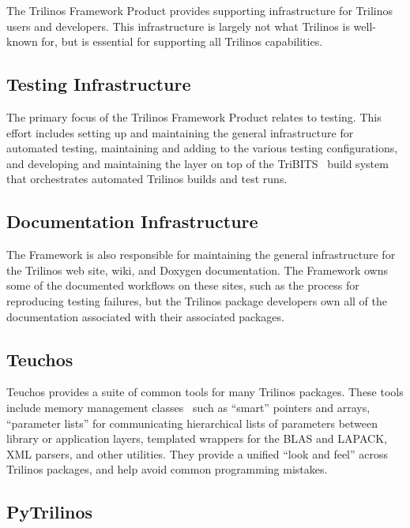 
The Trilinos Framework Product provides supporting infrastructure for Trilinos users and developers. This infrastructure is largely not what Trilinos is well-known for, but is essential for supporting all Trilinos capabilities.

\subsection{Testing Infrastructure}

The primary focus of the Trilinos Framework Product relates to testing. This effort includes setting up and maintaining the general infrastructure for automated testing, maintaining and adding to the various testing configurations, and developing and maintaining the layer on top of the TriBITS~\cite{Bartlett2014} build system that orchestrates automated Trilinos builds and test runs.

\subsection{Documentation Infrastructure}

The Framework is also responsible for maintaining the general infrastructure for the Trilinos web site, wiki, and Doxygen documentation. The Framework owns some of the documented workflows on these sites, such as the process for reproducing testing failures, but the Trilinos package developers own all of the documentation associated with their associated packages.

\subsection{Teuchos}

Teuchos provides a suite of common tools for many Trilinos packages. These tools include memory management classes~\cite{bartlett2010} such as ``smart'' pointers and arrays, ``parameter lists'' for communicating hierarchical lists of parameters between library or application layers, templated wrappers for the BLAS and LAPACK, XML parsers, and other utilities. They provide a unified ``look and feel'' across Trilinos packages, and help avoid common programming mistakes.

\subsection{PyTrilinos}

